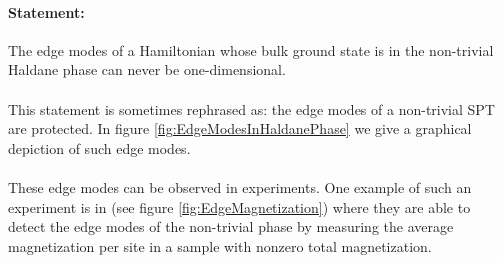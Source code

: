 \paragraph{Statement:}The edge modes of a Hamiltonian whose bulk ground state is in the non-trivial Haldane phase can never be one-dimensional.
\\\\
This statement is sometimes rephrased as: the edge modes of a non-trivial SPT are protected. In figure \ref{fig:EdgeModesInHaldanePhase} we give a graphical depiction of such edge modes.
\\\\
These edge modes can be observed in experiments. One example of such an experiment is in \cite{sompet2022realizing} (see figure \ref{fig:EdgeMagnetization}) where they are able to detect the edge modes of the non-trivial phase by measuring the average magnetization per site in a sample with nonzero total magnetization. 
